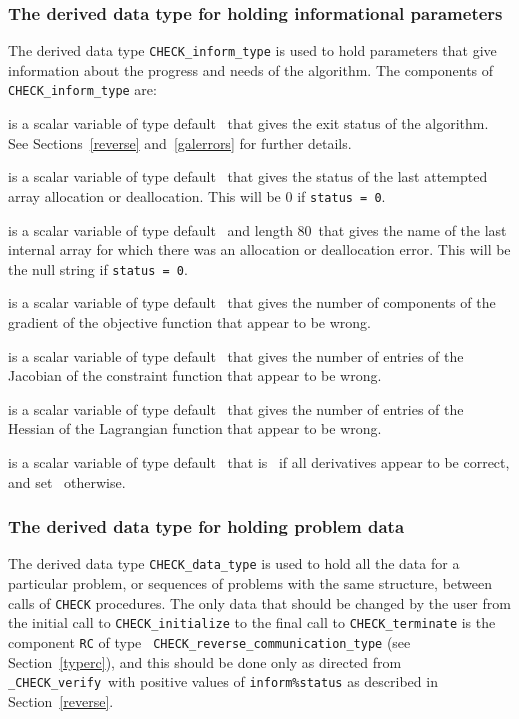 \documentclass{galahad}
\newcommand{\packagename}{CHECK}
\newcommand{\fullpackagename}{\libraryname\_\packagename}
\newcommand{\solver}{{\tt \fullpackagename\_verify}}
\begin{document}

\subsubsection{The derived data type for holding informational
 parameters}\label{typeinform}
The derived data type 
{\tt \packagename\_inform\_type} 
is used to hold parameters that give information about the progress and needs 
of the algorithm. The components of 
{\tt \packagename\_inform\_type} 
are:

\begin{description}

 is a scalar variable of type default \integer\ that gives the
exit status of the algorithm.  See Sections~\ref{reverse} and~\ref{galerrors} for further details.

 is a scalar variable of type default \integer\ that gives
the status of the last attempted array allocation or deallocation.
This will be 0 if {\tt status = 0}.

 is a scalar variable of type default \character\
and length 80\ that gives the name of the last internal array 
for which there was an allocation or deallocation error.
This will be the null string if {\tt status = 0}.

 is a scalar variable of type default \integer\ that gives the
number of components of the gradient of the objective function that
appear to be wrong.

 is a scalar variable of type default \integer\ that gives the
number of entries of the Jacobian of the constraint function that
appear to be wrong.

 is a scalar variable of type default \integer\ that gives the
number of entries of the Hessian of the Lagrangian function that
appear to be wrong.

 is a scalar variable of type default \logical\
that is \true\ if all derivatives appear to be correct, and set
\false\ otherwise. 

\end{description}


\subsubsection{The derived data type for holding problem data}\label{typedata}
The derived data type 
{\tt \packagename\_data\_type} 
is used to hold all the data for a particular problem,
or sequences of problems with the same structure, between calls of 
{\tt \packagename} procedures.  The only data that should be changed
by the user from the initial call to 
{\tt \packagename\_initialize}
to the final call to
{\tt \packagename\_terminate} is the component {\tt RC} of type {\tt
  \packagename\_reverse\_communication\_type} (see Section~\ref{typerc}), and this should be done
only as directed from \solver\ with positive values of {\tt inform\%status} as
described in Section~\ref{reverse}.
\end{document}
